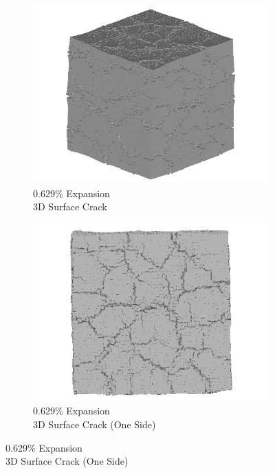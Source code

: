 \begin{figure}[ht!]
    \begin{subfigure}{.5\textwidth}
      \centering
      \includegraphics[width=0.5\linewidth]{Files/exp_3D/ASR/A15P75_4_3d.png}
      \caption{0.629\% Expansion\\3D Surface Crack}
    \end{subfigure}%
    \begin{subfigure}{.5\textwidth}
      \centering
      \includegraphics[width=0.5\linewidth]{Files/exp_3D/ASR/A15P75_4_3ds.png}
      \caption{0.629\% Expansion\\3D Surface Crack (One Side)}
    \end{subfigure}%


\end{figure}

